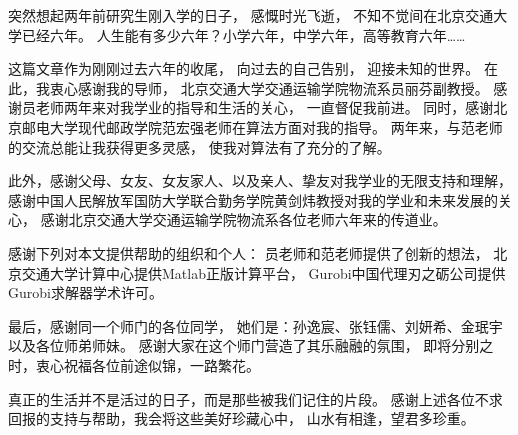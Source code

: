  \setlength{\baselineskip}{20pt}
\begin{thanks}
\noindent 

突然想起两年前研究生刚入学的日子，
感慨时光飞逝，
不知不觉间在北京交通大学已经六年。
人生能有多少六年？小学六年，中学六年，高等教育六年……

这篇文章作为刚刚过去六年的收尾，
向过去的自己告别，
迎接未知的世界。
在此，我衷心感谢我的导师，
北京交通大学交通运输学院物流系员丽芬副教授。
感谢员老师两年来对我学业的指导和生活的关心，
一直督促我前进。
同时，感谢北京邮电大学现代邮政学院范宏强老师在算法方面对我的指导。
两年来，与范老师的交流总能让我获得更多灵感，
使我对算法有了充分的了解。

此外，感谢父母、女友、女友家人、以及亲人、挚友对我学业的无限支持和理解，
感谢中国人民解放军国防大学联合勤务学院黄剑炜教授对我的学业和未来发展的关心，
感谢北京交通大学交通运输学院物流系各位老师六年来的传道业。

感谢下列对本文提供帮助的组织和个人：
员老师和范老师提供了创新的想法，
北京交通大学计算中心提供Matlab正版计算平台，
Gurobi中国代理刃之砺公司提供Gurobi求解器学术许可。

最后，感谢同一个师门的各位同学，
她们是：孙逸宸、张钰儒、刘妍希、金珉宇以及各位师弟师妹。
感谢大家在这个师门营造了其乐融融的氛围，
即将分别之时，衷心祝福各位前途似锦，一路繁花。

真正的生活并不是活过的日子，而是那些被我们记住的片段。
感谢上述各位不求回报的支持与帮助，我会将这些美好珍藏心中，
山水有相逢，望君多珍重。

\end{thanks}
